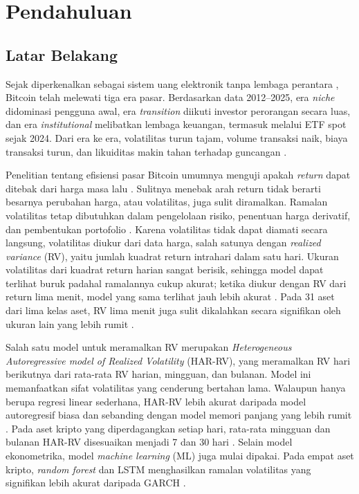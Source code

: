 \chapter{Pendahuluan}

\section{Latar Belakang}

Sejak diperkenalkan sebagai sistem uang elektronik tanpa lembaga perantara
\cite{nakamoto2008}, Bitcoin telah melewati tiga era pasar. Berdasarkan data
2012--2025, era \textit{niche} didominasi pengguna awal, era
\textit{transition} diikuti investor perorangan secara luas, dan era
\textit{institutional} melibatkan lembaga keuangan, termasuk melalui ETF spot
sejak 2024. Dari era ke era, volatilitas turun tajam, volume transaksi naik,
biaya transaksi turun, dan likuiditas makin tahan terhadap guncangan
\cite{do2026}.

Penelitian tentang efisiensi pasar Bitcoin umumnya menguji apakah
\textit{return} dapat ditebak dari harga masa lalu \cite{yi2023,mokni2024}.
Sulitnya menebak arah return tidak berarti besarnya perubahan harga, atau
volatilitas, juga sulit diramalkan. Ramalan volatilitas tetap dibutuhkan dalam
pengelolaan risiko, penentuan harga derivatif, dan pembentukan portofolio
\cite{chassot2026}. Karena volatilitas tidak dapat diamati secara langsung,
volatilitas diukur dari data harga, salah satunya dengan \textit{realized
variance} (RV), yaitu jumlah kuadrat return intrahari dalam satu hari. Ukuran
volatilitas dari kuadrat return harian sangat berisik, sehingga model dapat
terlihat buruk padahal ramalannya cukup akurat; ketika diukur dengan RV dari
return lima menit, model yang sama terlihat jauh lebih akurat
\cite{andersen1998}. Pada 31 aset dari lima kelas aset, RV lima menit juga
sulit dikalahkan secara signifikan oleh ukuran lain yang lebih rumit
\cite{liu2015}.

Salah satu model untuk meramalkan RV merupakan \textit{Heterogeneous
Autoregressive model of Realized Volatility} (HAR-RV), yang meramalkan RV hari
berikutnya dari rata-rata RV harian, mingguan, dan bulanan. Model ini
memanfaatkan sifat volatilitas yang cenderung bertahan lama. Walaupun hanya
berupa regresi linear sederhana, HAR-RV lebih akurat daripada model
autoregresif biasa dan sebanding dengan model memori panjang yang lebih rumit
\cite{corsi2009}. Pada aset kripto yang diperdagangkan setiap hari, rata-rata
mingguan dan bulanan HAR-RV disesuaikan menjadi 7 dan 30 hari \cite{qiu2025}.
Selain model ekonometrika, model \textit{machine learning} (ML) juga mulai
dipakai. Pada empat aset kripto, \textit{random forest} dan LSTM menghasilkan
ramalan volatilitas yang signifikan lebih akurat daripada GARCH
\cite{wang2023}.

